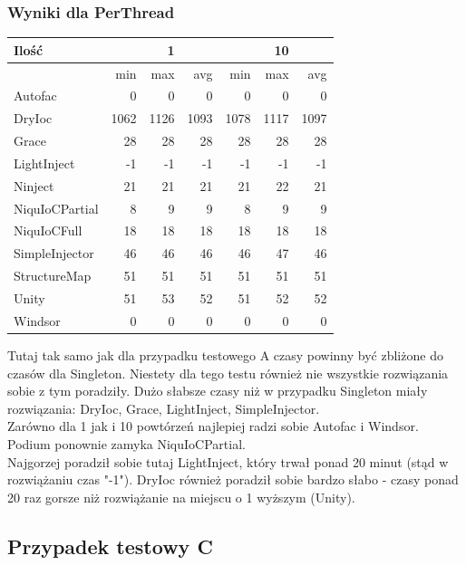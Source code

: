 \documentclass[12pt]{article}
\begin{document}
\subsubsection{Wyniki dla PerThread}
\begin{center}
\begin{small}
	\begin{tabular}{ | l | r r r | r r r | }
    		\hline
     		Ilość & & 1 & & & 10 &  \\ \hline
     		 & min & max & avg & min & max & avg \\ \hline
		Autofac & 0 & 0 & 0 & 0 & 0 & 0 \\ \hline
		DryIoc & 1062 & 1126 & 1093 & 1078 & 1117 & 1097 \\ \hline
		Grace & 28 & 28 & 28 & 28 & 28 & 28 \\ \hline
		LightInject & -1 & -1 & -1 & -1 & -1 & -1 \\ \hline
		Ninject & 21 & 21 & 21 & 21 & 22 & 21 \\ \hline
		NiquIoCPartial & 8 & 9 & 9 & 8 & 9 & 9 \\ \hline
		NiquIoCFull & 18 & 18 & 18 & 18 & 18 & 18 \\ \hline
		SimpleInjector & 46 & 46 & 46 & 46 & 47 & 46 \\ \hline
		StructureMap & 51 & 51 & 51 & 51 & 51 & 51 \\ \hline
		Unity & 51 & 53 & 52 & 51 & 52 & 52 \\ \hline
		Windsor & 0 & 0 & 0 & 0 & 0 & 0 \\
    		\hline
  	\end{tabular}
\end{small}
\end{center}
Tutaj tak samo jak dla przypadku testowego A czasy powinny być zbliżone do czasów dla Singleton. Niestety dla tego testu również nie wszystkie rozwiązania sobie z tym poradziły. Dużo słabsze czasy niż w przypadku Singleton miały rozwiązania: DryIoc, Grace, LightInject, SimpleInjector.\\
Zarówno dla 1 jak i 10 powtórzeń najlepiej radzi sobie Autofac i Windsor. Podium ponownie zamyka NiquIoCPartial.\\
Najgorzej poradził sobie tutaj LightInject, który trwał ponad 20 minut (stąd w rozwiążaniu czas "-1"). DryIoc również poradził sobie bardzo słabo - czasy ponad 20 raz gorsze niż rozwiążanie na miejscu o 1 wyższym (Unity).


\subsection{Przypadek testowy C}
\end{document}
